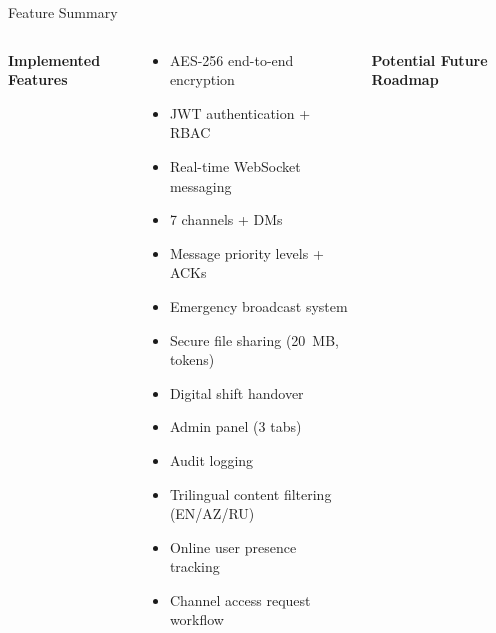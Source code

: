 \documentclass[aspectratio=169,12pt]{beamer}
\begin{document}
\begin{frame}{Feature Summary}
\begin{columns}[t]
\small\bfseries Implemented Features
\vspace{4pt}

\begin{tcolorbox}[colback=BPGreen!8,colframe=BPGreen,arc=5pt,
  left=4pt,right=4pt,top=4pt,bottom=4pt]
\small
\begin{itemize}\setlength\itemsep{4pt}
  \item[\faCheckCircle] AES-256 end-to-end encryption
  \item[\faCheckCircle] JWT authentication + RBAC
  \item[\faCheckCircle] Real-time WebSocket messaging
  \item[\faCheckCircle] 7 channels + DMs
  \item[\faCheckCircle] Message priority levels + ACKs
  \item[\faCheckCircle] Emergency broadcast system
  \item[\faCheckCircle] Secure file sharing (20~MB, tokens)
  \item[\faCheckCircle] Digital shift handover
  \item[\faCheckCircle] Admin panel (3 tabs)
  \item[\faCheckCircle] Audit logging
  \item[\faCheckCircle] Trilingual content filtering (EN/AZ/RU)
  \item[\faCheckCircle] Online user presence tracking
  \item[\faCheckCircle] Channel access request workflow
\end{itemize}
\end{tcolorbox}

\small\bfseries Potential Future Roadmap
\vspace{4pt}


\end{columns}
\end{frame}
\end{document}
